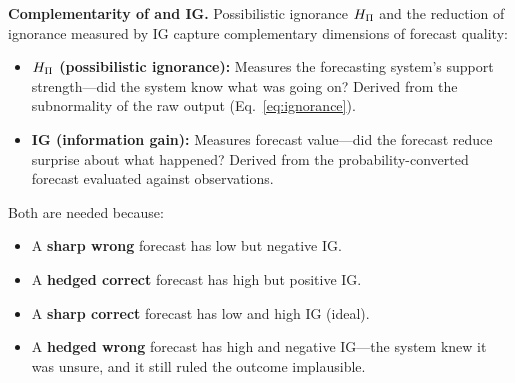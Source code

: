 \textbf{Complementarity of \ign{} and IG.}
Possibilistic ignorance $H_{\Pi}$ and the reduction
of ignorance measured by IG capture
complementary dimensions of forecast quality:
\begin{itemize}[leftmargin=2em]
\item \textbf{$H_{\Pi}$ (possibilistic ignorance):} Measures the
    forecasting system's support strength---did
    the system know what was going on?
    Derived from the subnormality of the raw output
    (Eq.~\ref{eq:ignorance}).
\item \textbf{IG (information gain):}
    Measures forecast value---did the
    forecast reduce surprise about what happened? Derived from the
    probability-converted forecast evaluated against observations.
\end{itemize}

Both are needed because:
\begin{itemize}[leftmargin=2em]
\item A \textbf{sharp wrong} forecast has low \ign{} but negative IG.
\item A \textbf{hedged correct} forecast has
    high \ign{} but positive IG.
\item A \textbf{sharp correct} forecast has
    low \ign{} and high IG (ideal).
\item A \textbf{hedged wrong} forecast has high \ign{} and negative
    IG---the system knew it was unsure,
    and it still ruled the outcome implausible.
\end{itemize}

\FloatBarrier
